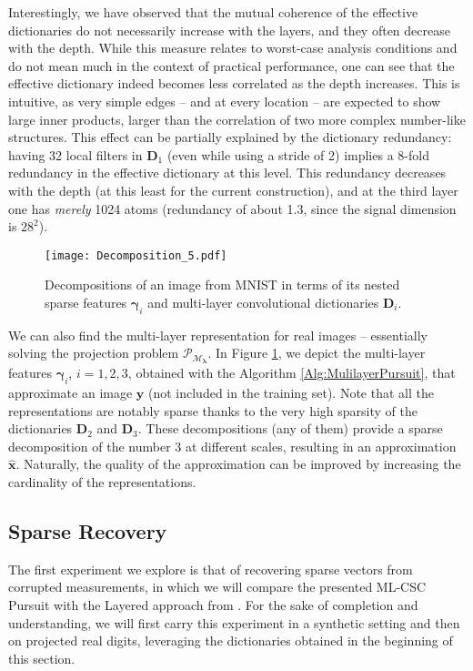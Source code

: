 \documentclass[10pt,journal]{IEEEtran}
\def\x{{\mathbf x}}
\def\y{{\mathbf y}}
\def\D{{\mathbf D}}
\def\M{{\mathcal{M}}}
\def\P{{\mathcal{P}}}
\def\gama{{\boldsymbol \gamma}}
\def\lamda{{\boldsymbol \lambda}}
\def\PM{{\P_{\M_\lamda}}}
\theoremstyle{plain}
\theoremstyle{definition}
\begin{document}
Interestingly, we have observed that the mutual coherence of the effective dictionaries do not necessarily increase with the layers, and they often decrease with the depth.
While this measure relates to worst-case analysis conditions and do not mean much in the context of practical performance, one can see that the effective dictionary indeed becomes less correlated as the depth increases. This is intuitive, as very simple edges -- and at every location -- are expected to show large inner products, larger than the correlation of two more complex number-like structures. This effect can be partially explained by the dictionary redundancy: having 32 local filters in $\D_1$ (even while using a stride of 2) implies a 8-fold redundancy in the effective dictionary at this level. This redundancy decreases with the depth (at this least for the current construction), and at the third layer one has \emph{merely} 1024 atoms (redundancy of about 1.3, since the signal dimension is $28^2$).


\begin{figure}
	\begin{center}
		\texttt{[image: Decomposition\_5.pdf]}
		\caption{Decompositions of an image from MNIST in terms of its nested sparse features $\gama_i$ and multi-layer convolutional dictionaries $\D_i$.}
		\label{fig:NumberDecomposition}
	\end{center}
\end{figure}
We can also find the multi-layer representation for real images -- essentially solving the projection problem $\PM$. In Figure \ref{fig:NumberDecomposition}, we depict the multi-layer features $\gama_i$, $i = 1,2,3$, obtained with the Algorithm \ref{Alg:MulilayerPursuit}, that approximate an image $\y$ (not included in the training set). Note that all the representations are notably sparse thanks to the very high sparsity of the dictionaries $\D_2$ and $\D_3$. These decompositions (any of them) provide a sparse decomposition of the number 3 at different scales, resulting in an approximation $\hat{\x}$. Naturally, the quality of the approximation can be improved by increasing the cardinality of the representations.



\subsection{Sparse Recovery}

The first experiment we explore is that of recovering sparse vectors from corrupted measurements, in which we will compare the presented ML-CSC Pursuit with the Layered approach from \cite{Papyan2016convolutional}. For the sake of completion and understanding, we will first carry this experiment in a synthetic setting and then on projected real digits, leveraging the dictionaries obtained in the beginning of this section.
\end{document}
